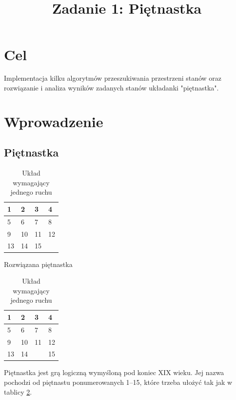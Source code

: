 \documentclass{classrep}
\author{
  \studentinfo{Patryk Lisik}{210254} \and
  \studentinfo{Adam Sadowski}{210310}
}
\title{Zadanie 1: Piętnastka}
\def \hfillx {\hspace*{-\textwidth} \hfill}
\begin{document}
\maketitle


\section{Cel}
Implementacja kilku algorytmów przeszukiwania przestrzeni stanów oraz rozwiązanie i analiza wyników zadanych stanów układanki "piętnastka". 

\section{Wprowadzenie}
\subsection{Piętnastka}
\begin{table}[H]
    \begin{minipage}[t]{0.5\textwidth}
        \centering
        \begin{tabular}{|l|l|l|l|}
            \hline
            1 & 2 & 3 & 4 \\ \hline
            5 & 6 & 7 & 8 \\ \hline
            9 & 10 & 11 & 12 \\ \hline
            13 & 14 & 15 &  \\ \hline
            \end{tabular}
        \caption{Rozwiązana piętnastka}
        \label{tab:solved}
    \end{minipage}
    \hfillx
    \begin{minipage}[t]{0.5\textwidth}
        \centering
        \begin{tabular}{|l|l|l|l|}
            \hline
            1 & 2 & 3 & 4 \\ \hline
            5 & 6 & 7 & 8 \\ \hline
            9 & 10 & 11 & 12 \\ \hline
            13 & 14 &  & 15 \\ \hline
            \end{tabular}
        \caption{Układ wymagający jednego ruchu}
    \end{minipage}
\end{table}

Piętnastka jest grą logiczną wymyśloną pod koniec XIX wieku.
Jej nazwa pochodzi od piętnastu ponumerowanych 1--15, które trzeba ułożyć tak jak w tablicy \ref{tab:solved}.
\end{document}
